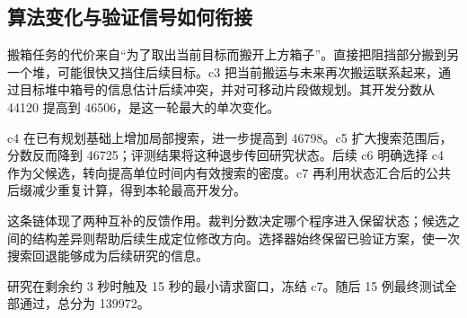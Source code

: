 \subsection{算法变化与验证信号如何衔接}
搬箱任务的代价来自“为了取出当前目标而搬开上方箱子”。直接把阻挡部分搬到另一个堆，可能很快又挡住后续目标。c3 把当前搬运与未来再次搬运联系起来，通过目标堆中箱号的信息估计后续冲突，并对可移动片段做规划。其开发分数从 44120 提高到 46506，是这一轮最大的单次变化。

c4 在已有规划基础上增加局部搜索，进一步提高到 46798。c5 扩大搜索范围后，分数反而降到 46725；评测结果将这种退步传回研究状态。后续 c6 明确选择 c4 作为父候选，转向提高单位时间内有效搜索的密度。c7 再利用状态汇合后的公共后缀减少重复计算，得到本轮最高开发分。

这条链体现了两种互补的反馈作用。裁判分数决定哪个程序进入保留状态；候选之间的结构差异则帮助后续生成定位修改方向。选择器始终保留已验证方案，使一次搜索回退能够成为后续研究的信息。

研究在剩余约 3 秒时触及 15 秒的最小请求窗口，冻结 c7。随后 15 例最终测试全部通过，总分为 139972。
